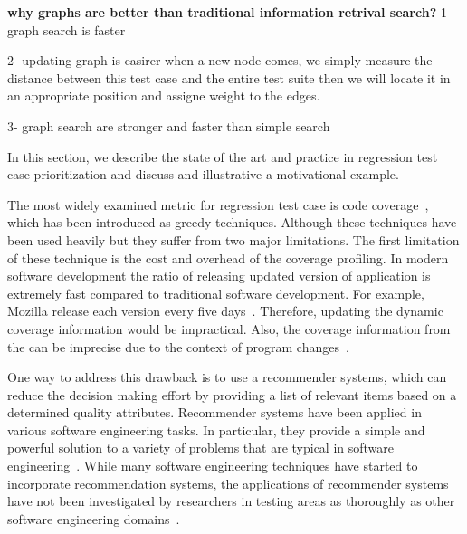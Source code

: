  




\textbf{why graphs are better than traditional information retrival search?}
1- graph search is faster

2- updating graph is easirer
when a new node comes, we simply measure the distance between this test
case and the entire test suite then we will locate it in an appropriate position
and assigne weight to the edges.

3- graph search are stronger and faster than simple search 






In this section, we describe the state of the art and practice 
in regression test case prioritization and discuss and illustrative
a motivational example.





The most widely examined metric for regression test case 
is code coverage~\cite{}, which has been introduced as greedy techniques.
Although these techniques have been used heavily but 
they suffer from two major limitations. The first limitation 
of these technique is the cost and overhead of the coverage 
profiling. In modern software development the ratio
of releasing updated version of application is extremely 
fast compared to traditional software development. For example,
Mozilla release each version every five days~\cite{bibid}. Therefore, 
updating the dynamic coverage information would be impractical. 
Also, the coverage information from the can be imprecise 
due to the context of program changes~\cite{sarfaraz}. 






One way to address this drawback is to use a recommender systems, 
which can reduce the decision making effort by providing a list of 
relevant items based on a determined quality attributes. 
Recommender systems have been applied in various software 
engineering tasks. In particular, they provide a simple and powerful
solution to a variety of problems that are typical in software engineering~\cite{bibid}. 
While many software engineering techniques have started to incorporate
recommendation systems, the applications of recommender systems have not
been investigated by researchers in testing areas as thoroughly 
as other software engineering domains~\cite{bibid}. 




